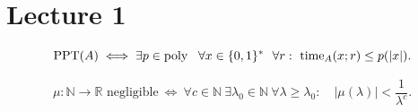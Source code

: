\documentclass[12pt,a4paper]{article}
\begin{document}
\section{Lecture 1}

\begin{definition}
\[
\mathrm{PPT}(A) \iff \exists p\in\poly\ \ \forall x\in\{0,1\}^{*}\ \ \forall r:\ \mathrm{time}_A(x;r)\le p(|x|).
\]
\end{definition}

\begin{definition}
\[
\mu:\mathbb{N}\to\mathbb{R}\text{ negligible}
\ \iff\ 
\forall c\in\mathbb{N}\ \exists \lambda_0\in\mathbb{N}\ \forall \lambda\ge\lambda_0:
\quad |\mu(\lambda)|<\frac{1}{\lambda^c}.
\]
\end{definition}
\end{document}
